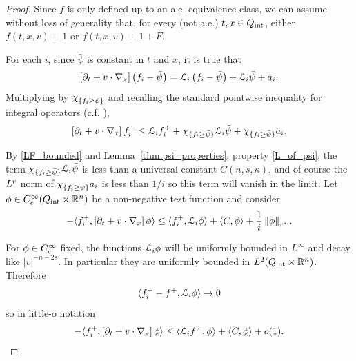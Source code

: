 \begin{proof}
Since $f$ is only defined up to an a.e.-equivalence class, we can assume without loss of generality that, for every (not a.e.) $t,x \in {Q_\textrm{int}}$, either $f(t,x,v) \equiv 1$ or $f(t,x,v) \equiv 1+F$.  

For each $i$, since $\bar{\psi}$ is constant in $t$ and $x$, it is true that
\[ \left[ \partial_t + v\cdot \nabla_x \right]\left( f_i - \bar{\psi} \right) = \mathcal{L}_i \left( f_i - \bar{\psi} \right) + \mathcal{L}_i\bar{\psi} + a_i. \]
Multiplying by $\chi_{\{f_i \geq \bar{\psi}\}}$ and recalling the standard pointwise inequality for integral operators (c.f. \cite{CaSi.pointwise}),
\[ \left[ \partial_t + v\cdot \nabla_x \right] {f_i^+} \leq \mathcal{L}_i {f_i^+} + \chi_{\{f_i \geq \bar{\psi}\}} \mathcal{L}_i\bar{\psi} + \chi_{\{f_i \geq \bar{\psi}\}} a_i. \]

By \eqref{LF_bounded} and Lemma~\ref{thm:psi_properties}, property \eqref{L_of_psi}, the term $\chi_{\{f_i \geq \bar{\psi}\}} \mathcal{L}_i\bar{\psi}$ is less than a universal constant $C(n,s,\kappa)$, and of course the $L^{r}$ norm of $\chi_{\{f_i \geq \bar{\psi}\}} a_i$ is less than $1/i$ so this term will vanish in the limit.  Let $\phi \in C_c^\infty({Q_\textrm{int}} \times \mathbb{R}^n)$ be a non-negative test function and consider
\[ -\langle {f_i^+}, \left[ \partial_t + v\cdot \nabla_x \right]\phi \rangle \leq \langle {f_i^+}, \mathcal{L}_i \phi \rangle + \langle C, \phi \rangle + \frac{1}{i} \left\lVert\phi\right\rVert_{{r}^\ast}. \]

For $\phi \in C_c^\infty$ fixed, the functions $\mathcal{L}_i \phi$ will be uniformly bounded in $L^\infty$ and decay like $|v|^{-n-2s}$.  In particular they are uniformly bounded in $L^2({Q_\textrm{int}} \times \mathbb{R}^n)$.  Therefore
\[ \langle {f_i^+} - f^+, \mathcal{L}_i \phi \rangle \to 0 \]
so in little-o notation
\[ -\langle {f_i^+}, \left[ \partial_t + v\cdot \nabla_x \right]\phi \rangle \leq \langle \mathcal{L}_i f^+, \phi \rangle + \langle C, \phi \rangle + o(1). \]




\end{proof}
